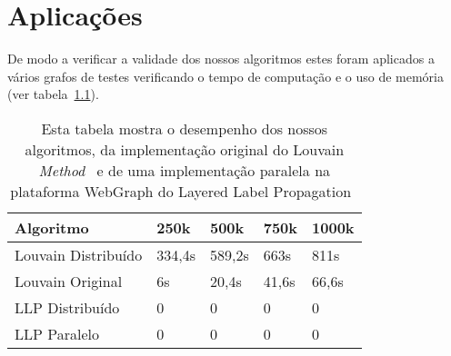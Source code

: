\chapter{Aplicações}
De modo a verificar a validade dos nossos algoritmos estes foram aplicados a vários grafos de testes verificando o tempo de computação e o uso de memória (ver tabela~\ref{tbl:tm}).
\begin{table}
	\centering
 \begin{tabular}{|l|l|l|l|l|}
 \hline
			Algoritmo & 250k & 500k & 750k & 1000k \\ \hline
			Louvain Distribuído&334,4s&589,2s&663s&811s\\ \hline
			Louvain Original&6s&20,4s&41,6s&66,6s\\ \hline
			LLP Distribuído& 0 & 0 &0 &0\\ \hline
			LLP Paralelo&0&0&0&0 \\ \hline
		\end{tabular}
		\caption{Esta tabela mostra o desempenho dos nossos algoritmos, da implementação original do Louvain \textit{Method}~\cite{orgLouvain} e de uma implementação paralela na plataforma WebGraph do Layered Label Propagation~\cite{prlLLP}}
		\label{tbl:tm}
\end{table}
